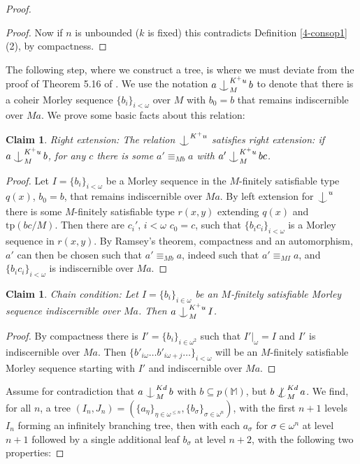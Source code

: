 \documentclass[12pt]{amsart}
\newtheorem{claim}[theorem]{Claim}
\theoremstyle{definition}
\def\Ind#1#2{#1\setbox0=\hbox{$#1x$}\kern\wd0\hbox to 0pt{\hss$#1\mid$\hss}
\lower.9\ht0\hbox to 0pt{\hss$#1\smile$\hss}\kern\wd0}
\def\ind{\mathop{\mathpalette\Ind{}}}
\def\notind#1#2{#1\setbox0=\hbox{$#1x$}\kern\wd0
\hbox to 0pt{\mathchardef\nn=12854\hss$#1\nn$\kern1.4\wd0\hss}
\hbox to 0pt{\hss$#1\mid$\hss}\lower.9\ht0 \hbox to 0pt{\hss$#1\smile$\hss}\kern\wd0}
\def\nind{\mathop{\mathpalette\notind{}}}
\begin{document}
\begin{proof}
\begin{proof}
        Now if $n$ is unbounded ($k$ is fixed) this contradicts Definition \ref{4-consop1} (2), by compactness.
    \end{proof}


     The following step, where we construct a tree, is where we must deviate from the proof of Theorem 5.16 of \cite{KR17}. We use the notation $a\ind^{K^{+}u}_{M} b$ to denote that there is a coheir Morley sequence $\{b_{i}\}_{i < \omega}$ over $M$ with $b_{0} = b$ that remains indiscernible over $Ma$. We prove some basic facts about this relation:

    \begin{claim}\label{4-rext}
        Right extension: The relation $\ind^{K^{+}u}$ satisfies right extension: if $a \ind^{K^{+}u}_{M} b$, for any $c$ there is some $a' \equiv_{Mb} a$ with  $a' \ind^{K^{+}u}_{M} bc$.
    \end{claim}
    \begin{proof}
        Let $I=\{b_{i}\}_{i < \omega}$ be a Morley sequence in the $M$-finitely satisfiable type $q(x)$, $b_{0} = b$, that remains indiscernible over $Ma$. By left extension for $\ind^{u}$ there is some $M$-finitely satisfiable type $r(x, y)$ extending $q(x)$ and $\mathrm{tp}(bc/M)$. Then there are $c_{i}'$, $i < \omega$ $c_{0} = c$, such that $\{b_{i}c_{i}\}_{i<\omega}$ is a Morley sequence in $r(x, y)$. By Ramsey's theorem, compactness and an automorphism, $a'$ can then be chosen such that $a' \equiv_{Mb} a$, indeed such that $a'\equiv_{MI} a$, and $\{b_{i}c_{i}\}_{i<\omega}$ is indiscernible over $Ma$.
    \end{proof}

    \begin{claim}\label{4-cc3}
        Chain condition: Let $I=\{b_{i}\}_{i \in \omega}$ be an $M$-finitely satisfiable Morley sequence indiscernible over $Ma$. Then $a \ind^{K^{+}u}_{M} I$.
    \end{claim}

\begin{proof}
    By compactness there is $I'=\{b_{i}\}_{i \in \omega^{2}}$ such that $I'|_{\omega} = I$ and $I'$ is indiscernible over $Ma$. Then $\{b'_{i \omega} \ldots b'_{i \omega+j} \ldots \}_{i < \omega}$ will be an $M$-finitely satisfiable Morley sequence starting with $I'$ and indiscernible over $Ma$.
\end{proof}


Assume for contradiction that $a \ind^{Kd}_{M} b$ with $b \subseteq p(\mathbb{M})$, but $b \nind^{Kd}_{M} a$. We find, for all $n$, a tree $(I_{n}, J_{n})= (\{a_{\eta}\}_{\eta \in \omega^{\leq n}}, \{b_{\sigma}\}_{\sigma \in \omega^{n}})$, with the first $n+1$ levels $I_{n}$ forming an infinitely branching tree, then with each $a_{\sigma}$ for $\sigma \in \omega^{n}$ at level $n+1$ followed by a single additional leaf $b_{\sigma}$ at level $n+2$, with the following two properties:


\end{proof}
\end{document}
